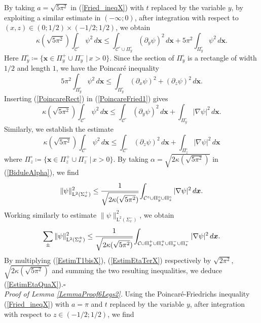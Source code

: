 \documentclass[11pt,a4paper]{article}
\newcommand{\dsp}{\displaystyle}
\newcommand{\mrm}[1]{\mathrm{#1}}
\newcommand{\bfx}{\boldsymbol{x}}
\newcommand{\mL}{\mrm{L}}
\begin{document}
By taking $a=\sqrt{5\pi^2}$ in (\ref{Fried_ineqX}) with $t$ replaced by the variable $y$, by exploiting a similar estimate in $(-\infty;0)$, after integration with respect to $(x,z)\in(0;1/2)\times(-1/2;1/2)$, we obtain 
\begin{equation}\label{PoincareFried1}
\kappa(\sqrt{5\pi^2})\dsp\int_{\mathcal{C}^{\circ}}\psi^2\,d\bfx \le \int_{\mathcal{C}^{\circ}\cup\Pi^{\circ}_y}(\partial_y\psi)^2\,d\bfx+5\pi^2\int_{\Pi^{\circ}_y}\psi^2\,d\bfx.
\end{equation}
Here $\Pi^{\circ}_y\coloneqq\{\bfx\in\Pi^+_y\cup\Pi^-_y\,|\,x>0\}$. Since the section of $\Pi^{\circ}_y$ is a rectangle of width $1/2$ and length $1$, we have the Poincar\'e inequality
\begin{equation}\label{PoincareRect}
5\pi^2\int_{\Pi^{\circ}_y}\psi^2\,d\bfx \le \int_{\Pi^{\circ}_y}(\partial_x\psi)^2+(\partial_z\psi)^2\,d\bfx.
\end{equation}
Inserting (\ref{PoincareRect}) in (\ref{PoincareFried1}) gives 
\[
\kappa(\sqrt{5\pi^2})\dsp\int_{\mathcal{C}^{\circ}}\psi^2\,d\bfx \le \int_{\mathcal{C}^{\circ}}(\partial_y\psi)^2\,d\bfx+\int_{\Pi^{\circ}_y}|\nabla\psi|^2\,d\bfx.
\]
Similarly, we establish the estimate
\[
\kappa(\sqrt{5\pi^2})\dsp\int_{\mathcal{C}^{\circ}}\psi^2\,d\bfx \le \int_{\mathcal{C}^{\circ}}(\partial_z\psi)^2\,d\bfx+\int_{\Pi^{\circ}_z}|\nabla\psi|^2\,d\bfx
\]
where $\Pi^{\circ}_z\coloneqq\{\bfx\in\Pi^+_z\cup\Pi^-_z\,|\,x>0\}$. By taking $\alpha=\sqrt{2\kappa(\sqrt{5\pi^2})}$ in (\ref{BiduleAlpha}), we find
\[
\|\psi\|_{\mL^2(\Sigma^+_x)}^2 \le \cfrac{1}{\sqrt{2\kappa(\sqrt{5\pi^2})}}\int_{\mathcal{C}^{\circ}\cup\Pi^{\circ}_y\cup\Pi^{\circ}_z}|\nabla\psi|^2\,d\bfx.
\]
Working similarly to estimate $\|\psi\|^2_{\mL^2(\Sigma^-_x)}$, we obtain
\begin{equation}\label{EstimEtaTerX}
\sum_\pm\|\psi\|_{\mL^2(\Sigma^\pm_x)}^2 \le \cfrac{1}{\sqrt{2\kappa(\sqrt{5\pi^2})}}\int_{\mathcal{C}\cup\Pi^+_y\cup\Pi^+_z\cup\Pi^-_y\cup\Pi^-_z}|\nabla\psi|^2\,d\bfx.
\end{equation}
By multiplying (\ref{EstimT1bisX}), (\ref{EstimEtaTerX}) respectively by $\sqrt{2\pi^2}$, $\sqrt{2\kappa(\sqrt{5\pi^2})}$ and summing the two resulting inequalities, we deduce (\ref{EstimEtaQuaX}).\hfill $\square$\\
\newline
\noindent \textit{Proof of Lemma \ref{LemmaProof6Legs2}.} Using the Poincar\'e-Friedrichs inequality (\ref{Fried_ineqX}) with $a=\pi$ and $t$ replaced by the variable $y$, after integration with respect to $z\in(-1/2;1/2)$, we find
\end{document}
